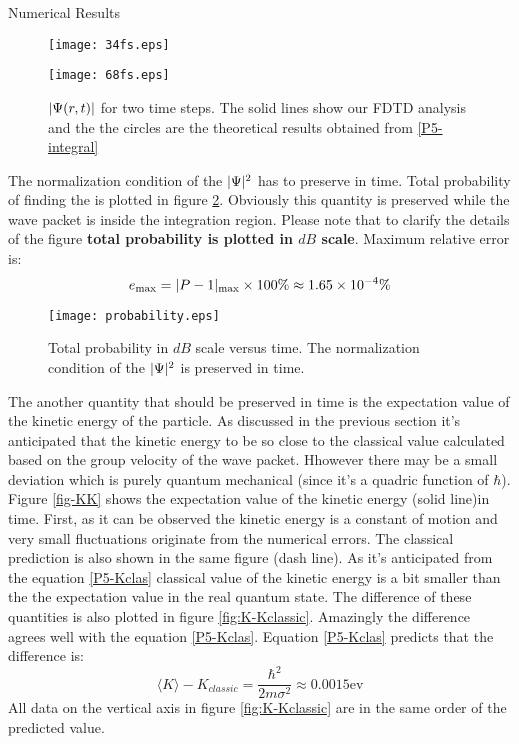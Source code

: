 \begin{homeworkProblem}
\begin{homeworkSection}{Numerical Results}
\begin{figure}[!h]
\begin{minipage}[b]{1\linewidth}
\centering
\texttt{[image: 34fs.eps]}
\end{minipage}
\begin{minipage}[b]{1\linewidth}
\centering
\texttt{[image: 68fs.eps]}
\end{minipage}
\caption{\small  $\lvert\Psi(r,t)\rvert$ for two time steps. The solid lines show our FDTD analysis and the the circles are the theoretical results obtained from \eqref{P5-integral}}
\label{fig:Psi}
\end{figure}

The normalization condition of the $\lvert\Psi\rvert^2$ has to preserve in time. Total probability of finding the is plotted in figure \ref{fig:prob}. Obviously this quantity is preserved while the wave packet is inside the integration region. Please note that to clarify the details of the figure \textbf{total probability is plotted in $dB$ scale}. Maximum relative error is:
\begin{equation}
e_{\max}=\lvert P-1\rvert_{\max}\times 100\%\approx 1.65\times 10^{-4}\%
\end{equation}  

\begin{figure}[!h]
\centering
\texttt{[image: probability.eps]}
\caption{\small  Total probability in $dB$ scale versus time. The normalization condition of the $\lvert\Psi\rvert^2$ is  preserved in time. }
\label{fig:prob}
\end{figure} 


The another quantity that should be preserved in time is the expectation value of the kinetic energy of the particle. As discussed in the previous section it's anticipated that the kinetic energy to be so close to the classical value calculated based on the group velocity of the wave packet. Hhowever there may be a small deviation which is purely quantum mechanical (since it's a quadric function of $\hbar$). Figure \ref{fig-KK} shows the expectation value of the kinetic energy (solid line)in time.
First, as it can be observed the kinetic energy is a constant of motion and very small fluctuations originate from the numerical errors. The classical prediction is also shown in the same figure (dash line). As it's anticipated from the equation \eqref{P5-Kclas} classical value of the kinetic energy is a bit smaller than the the expectation value in the real quantum state. The difference of these quantities is also plotted in figure \ref{fig:K-Kclassic}. Amazingly the difference agrees well with the equation \eqref{P5-Kclas}. Equation \eqref{P5-Kclas} predicts that the difference is:
$$\langle K\rangle-K_{classic}=\frac{\hbar^2}{2m\sigma^2}\approx 0.0015 \mathrm{ev}$$
All data on the vertical axis in figure \ref{fig:K-Kclassic} are in the same order of the predicted value.




\end{homeworkSection}
\end{homeworkProblem}
